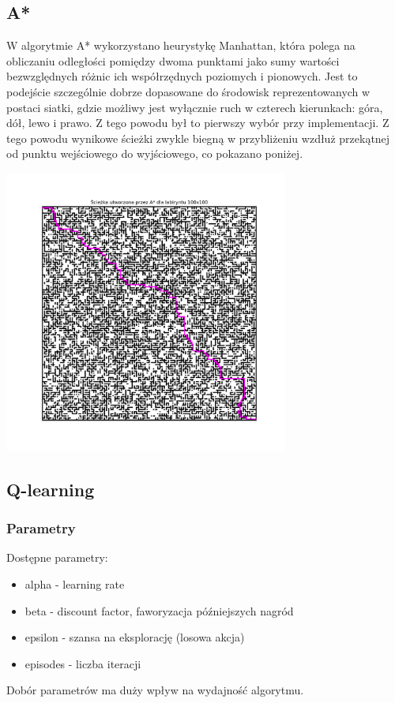 \documentclass[a4paper,12pt]{article}
\begin{document}
\subsection{A*}
	W algorytmie A* wykorzystano heurystykę Manhattan, która polega na obliczaniu odległości pomiędzy dwoma punktami jako sumy wartości bezwzględnych różnic ich współrzędnych poziomych i pionowych. Jest to podejście szczególnie dobrze dopasowane do środowisk reprezentowanych w postaci siatki, gdzie możliwy jest wyłącznie ruch w czterech kierunkach: góra, dół, lewo i prawo. Z tego powodu był to pierwszy wybór przy implementacji. Z tego powodu wynikowe ścieżki zwykle biegną w przybliżeniu wzdłuż przekątnej od punktu wejściowego do wyjściowego, co pokazano poniżej.
\begin{center}
    \includegraphics[width=0.7\textwidth]{../images/A*_path.png}
\end{center}

\subsection{Q-learning}
    \subsubsection{Parametry}
    Dostępne parametry:
    \begin{itemize}
        \item alpha - learning rate
        \item beta - discount factor, faworyzacja późniejszych nagród
        \item epsilon - szansa na eksplorację (losowa akcja)
        \item episodes - liczba iteracji
    \end{itemize}
    Dobór parametrów ma duży wpływ na wydajność algorytmu.
\end{document}
